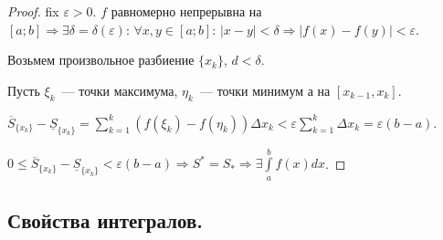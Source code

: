 \documentclass[12pt]{article}
\newcommand{\dint}{\displaystyle\int}
\begin{document}
	\begin{proof}
		fix $\varepsilon > 0$. $f$ равномерно непрерывна на $[a; b] \Rightarrow \exists \delta = \delta(\varepsilon): \, \forall x, y \in [a; b]: \, |x - y| < \delta \Rightarrow |f(x) - f(y)| < \varepsilon$.
		
		Возьмем произвольное разбиение $\{ x_k \}$, $d < \delta$.
		
		Пусть $\xi_k$~--- точки максимума, $\eta_k$~--- точки минимум а на $[x_{k - 1}, x_k]$.
		
		$\overline{S}_{\{ x_k \}} - \underline{S}_{\{ x_k \}} = \sum\limits_{k = 1}^k (f(\xi_k) - f(\eta_k)) \varDelta x_k < \varepsilon \sum\limits_{k = 1}^k \varDelta x_k = \varepsilon (b - a)$.
		
		$0 \leqslant \overline{S}_{\{ x_k\}} - \underline{S}_{\{ x_k \}} < \varepsilon (b - a) \Rightarrow S^* = S_* \Rightarrow \exists \dint\limits_a^b f(x) dx$.
	\end{proof}
	
		\subsection{Свойства интегралов.}
	
\end{document}
